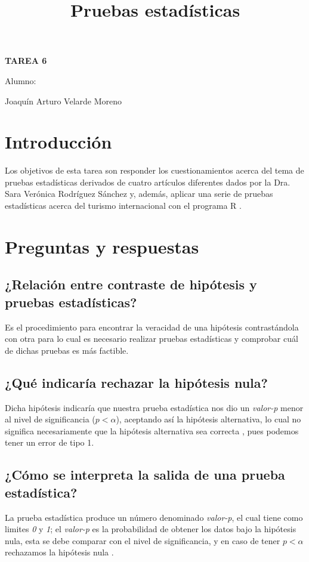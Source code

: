 \documentclass[]{article}
\title{Pruebas estadísticas }
\date{}
\begin{document}
	\maketitle
	\begin{center}


\centerline{\textbf{TAREA 6} } 
\textbf{ }

\centerline{Alumno: } 
\centerline{Joaquín Arturo Velarde Moreno}


	\end{center}
	

\section{Introducción}
Los objetivos de esta tarea son responder los cuestionamientos acerca del tema de pruebas estadísticas derivados de cuatro artículos diferentes dados por la Dra. Sara Verónica Rodríguez Sánchez y, además, aplicar una serie de pruebas estadísticas acerca del turismo internacional con el programa R \cite{rproject}.


\section{Preguntas y respuestas}
\subsection{¿Relación entre contraste de hipótesis y pruebas estadísticas?}
Es el procedimiento para encontrar la veracidad de una hipótesis contrastándola con otra para lo cual es necesario realizar pruebas estadísticas y comprobar cuál de dichas pruebas es más factible.

\subsection{¿Qué indicaría rechazar la hipótesis nula?}
Dicha hipótesis indicaría que nuestra prueba estadística nos dio un \textit{valor-p} menor al nivel de significancia (\textit{$p < \alpha $}), aceptando así la hipótesis alternativa, lo cual no significa necesariamente que la hipótesis alternativa sea correcta \cite{Articulo_1}, pues podemos tener un error de tipo 1.

\subsection{¿Cómo se interpreta la salida de una prueba estadística?}
La prueba estadística produce un número denominado \textit{valor-p}, el cual tiene como limites \textit{0} y \textit{1}; el \textit{valor-p} es la probabilidad de obtener los datos bajo la hipótesis nula, esta se debe comparar con el nivel de significancia, y en caso de tener \textit{$p < \alpha $} rechazamos la hipótesis nula \cite{Articulo_1}.
\end{document}
